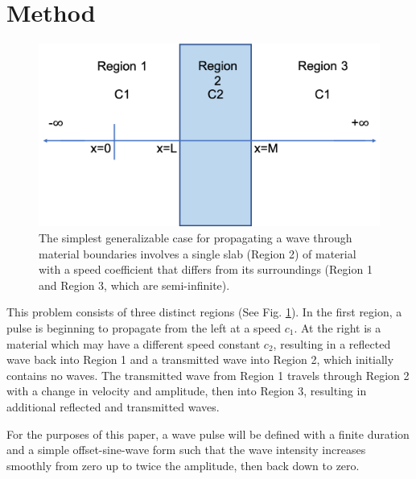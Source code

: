 \documentclass[twocolumn, letterpaper]{article}
\begin{document}



\section*{Method}
\begin{figure}
\includegraphics[width=\columnwidth]{regions}
\caption{The simplest generalizable case for propagating a wave through material boundaries involves a single slab (Region 2) of material with a speed coefficient that differs from its surroundings (Region 1 and Region 3, which are semi-infinite).}
\label{fig:regions}
\end{figure}

This problem consists of three distinct regions (See Fig. \ref{fig:regions}). In the first region, a pulse is beginning to propagate from the left at a speed $c_1$. At the right is a material which may have a different speed constant $c_2$, resulting in a reflected wave back into Region 1 and a transmitted wave into Region 2, which initially contains no waves. The transmitted wave from Region 1 travels through Region 2 with a change in velocity and amplitude, then into Region 3, resulting in additional reflected and transmitted waves.

For the purposes of this paper, a wave pulse will be defined with a finite duration and a simple offset-sine-wave form such that the wave intensity increases smoothly from zero up to twice the amplitude, then back down to zero.
\end{document}
